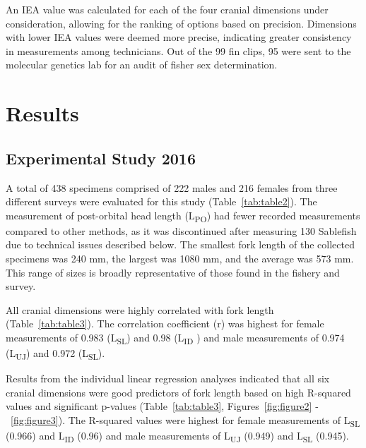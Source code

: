 \documentclass[12pt]{article}\usepackage[]{graphicx}\usepackage[]{color}
\begin{document}
An IEA value was calculated for each of the four cranial dimensions under consideration, allowing for the ranking of options based on precision. Dimensions with lower IEA values were deemed more precise, indicating greater consistency in measurements among technicians. Out of the 99 fin clips, 95 were sent to the molecular genetics lab for an audit of fisher sex determination.

\hypertarget{results}{%
\section{Results}\label{results}}

\hypertarget{experimental-study-2016-1}{%
\subsection{Experimental Study 2016}\label{experimental-study-2016-1}}

A total of 438 specimens comprised of 222 males and 216 females from three different surveys were evaluated for this study (Table~\ref{tab:table2}). The measurement of post-orbital head length (L\textsubscript{PO}) had fewer recorded measurements compared to other methods, as it was discontinued after measuring 130 Sablefish due to technical issues described below. The smallest fork length of the collected specimens was 240 mm, the largest was 1080 mm, and the average was 573 mm. This range of sizes is broadly representative of those found in the fishery and survey.

All cranial dimensions were highly correlated with fork length (Table~\ref{tab:table3}). The correlation coefficient (r) was highest for female measurements of 0.983 (L\textsubscript{SL}) and 0.98 (L\textsubscript{ID} ) and male measurements of 0.974 (L\textsubscript{UJ}) and 0.972 (L\textsubscript{SL}).

Results from the individual linear regression analyses indicated that all six cranial dimensions were good predictors of fork length based on high R-squared values and significant p-values (Table~\ref{tab:table3}, Figures~\ref{fig:figure2} -~\ref{fig:figure3}). The R-squared values were highest for female measurements of L\textsubscript{SL} (0.966) and L\textsubscript{ID} (0.96) and male measurements of L\textsubscript{UJ} (0.949) and L\textsubscript{SL} (0.945).
\end{document}
